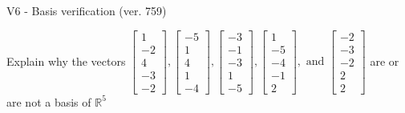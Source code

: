 \begin{exercise}
  \begin{exerciseTitle}V6 - Basis verification (ver. 759)\end{exerciseTitle}
  \begin{exerciseStatement}
    Explain why the vectors \(\left[\begin{array}{r}
1 \\
-2 \\
4 \\
-3 \\
-2
\end{array}\right] , \left[\begin{array}{r}
-5 \\
1 \\
4 \\
1 \\
-4
\end{array}\right] , \left[\begin{array}{r}
-3 \\
-1 \\
-3 \\
1 \\
-5
\end{array}\right] , \left[\begin{array}{r}
1 \\
-5 \\
-4 \\
-1 \\
2
\end{array}\right] , \text{ and } \left[\begin{array}{r}
-2 \\
-3 \\
-2 \\
2 \\
2
\end{array}\right]\) are or are not a basis of \(\mathbb{R}^5\)	



\end{exerciseStatement}
\end{exercise}
